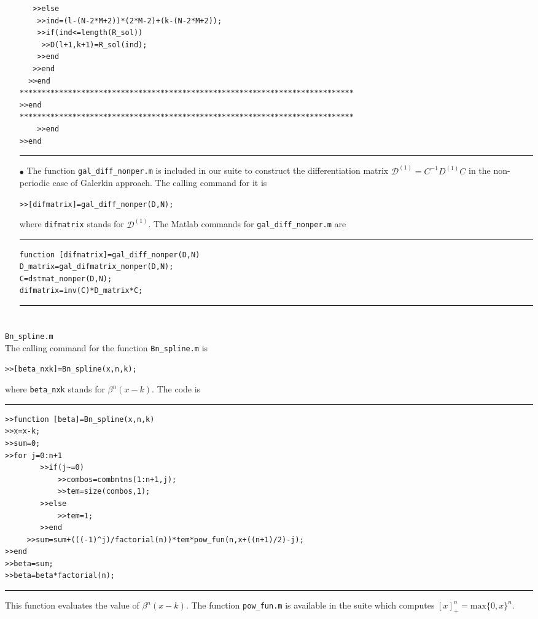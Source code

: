 \documentclass[acmtoms]{acmtrans2m}
\begin{document}
\begin{itemize}
\begin{verbatim}
   >>else
    >>ind=(l-(N-2*M+2))*(2*M-2)+(k-(N-2*M+2));
    >>if(ind<=length(R_sol))
     >>D(l+1,k+1)=R_sol(ind);
    >>end
   >>end
  >>end
****************************************************************************
>>end
****************************************************************************
    >>end
>>end
\end{verbatim}
\hrule\vspace{.5cm}
\item[$\bullet$]
The function \verb#gal_diff_nonper.m# is included in our suite to construct the differentiation matrix $\mathcal{D}^{(1)}=C^{-1}D^{(1)}C$ in the non-periodic case of Galerkin approach. The calling command for it is
\begin{alltt}
>>[difmatrix]=gal_diff_nonper(D,N);
\end{alltt}
where \verb#difmatrix# stands for $\mathcal{D}^{(1)}$. The Matlab commands for \verb#gal_diff_nonper.m# are\\
\hrule
\begin{verbatim}
function [difmatrix]=gal_diff_nonper(D,N)
D_matrix=gal_difmatrix_nonper(D,N);
C=dstmat_nonper(D,N);
difmatrix=inv(C)*D_matrix*C;
\end{verbatim}
\hrule
\vspace{.5cm}
\end{itemize}
\section{} \verb#Bn_spline.m# \\
The calling command for the function
\verb#Bn_spline.m# is
\begin{alltt}
>>[beta_nxk]=Bn_spline(x,n,k);
\end{alltt}
where \verb#beta_nxk# stands for $\beta^n(x-k)$. The code is\\
\hrule
\begin{verbatim}
>>function [beta]=Bn_spline(x,n,k)
>>x=x-k;
>>sum=0;
>>for j=0:n+1
        >>if(j~=0)
            >>combos=combntns(1:n+1,j);
            >>tem=size(combos,1);
        >>else
            >>tem=1;
        >>end
     >>sum=sum+(((-1)^j)/factorial(n))*tem*pow_fun(n,x+((n+1)/2)-j);
>>end
>>beta=sum;
>>beta=beta*factorial(n);
\end{verbatim}
\hrule \vspace{.5cm} 
This function evaluates the value of
$\beta^n(x-k)$. The function \verb#pow_fun.m#
is available in the suite which computes $[x]_+^n=\mbox{max}\{0,x\}^n$.
\end{document}
